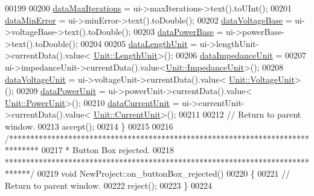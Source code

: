 \begin{DoxyCode}
00199 
00200   \hyperlink{class_new_project_a189825d570bc9bc35c61f7fe40de986a}{dataMaxIterations} = ui->maxIterations->text().toUInt();
00201   \hyperlink{class_new_project_a186c2163239625faf8c7769a72fa988c}{dataMinError} = ui->minError->text().toDouble();
00202   \hyperlink{class_new_project_a21dc54f9c0c8a59ca33eaa42cb9f9352}{dataVoltageBase} = ui->voltageBase->text().toDouble();
00203   \hyperlink{class_new_project_a7a70270ca856001875a6043d5aa7a8af}{dataPowerBase} = ui->powerBase->text().toDouble();
00204 
00205   \hyperlink{class_new_project_ac0bf8b4f04f5c9425c74dd980711f021}{dataLengthUnit} = ui->lengthUnit->currentData().value<
      \hyperlink{class_unit_a8c8921f7b225ad6063b1cb573425b9a0}{Unit::LengthUnit}>();
00206   \hyperlink{class_new_project_ae50ce899e9b67db0001a11044730a778}{dataImpedanceUnit} =
00207     ui->impedanceUnit->currentData().value<\hyperlink{class_unit_a3747e779c805df24a71961290be3fbdf}{Unit::ImpedanceUnit}>();
00208   \hyperlink{class_new_project_a04187cd16b01b80dcdef9107e4c83a28}{dataVoltageUnit} = ui->voltageUnit->currentData().value<
      \hyperlink{class_unit_a55b07dfa9457e1eca2c7194fe0cfc3c1}{Unit::VoltageUnit}>();
00209   \hyperlink{class_new_project_a500a8b98942c5f4900348fd315fb9d8b}{dataPowerUnit} = ui->powerUnit->currentData().value<
      \hyperlink{class_unit_ace265ae255370ccacfd5370337572c3b}{Unit::PowerUnit}>();
00210   \hyperlink{class_new_project_a9d389065ff7f8588338069018088a20f}{dataCurrentUnit} = ui->currentUnit->currentData().value<
      \hyperlink{class_unit_a0794cf6c9682f48296dd4a5315389787}{Unit::CurrentUnit}>();
00211 
00212 \textcolor{comment}{// Return to parent window.}
00213   accept();
00214 \}
00215 
00216 \textcolor{comment}{/*******************************************************************************}
00217 \textcolor{comment}{ * Button Box rejected.}
00218 \textcolor{comment}{ ******************************************************************************/}
00219 \textcolor{keywordtype}{void} NewProject::on\_buttonBox\_rejected()
00220 \{
00221 \textcolor{comment}{// Return to parent window.}
00222   reject();
00223 \}
00224 
\end{DoxyCode}
